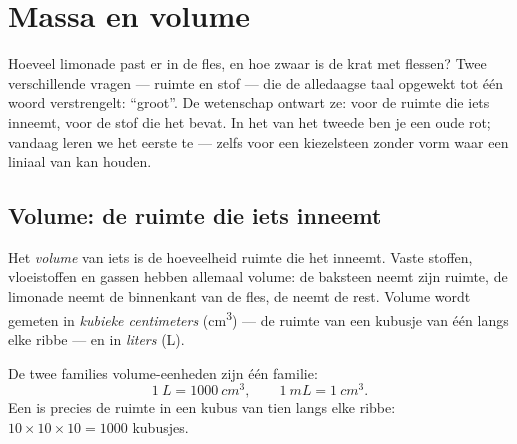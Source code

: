 \chapter{Massa en volume}\label{ch:g6:mass-and-volume}

Hoeveel limonade past er in de fles, en hoe zwaar is de krat met
flessen? Twee verschillende vragen --- ruimte en stof --- die de
alledaagse taal opgewekt tot één woord verstrengelt: ``groot''. De
wetenschap ontwart ze:  voor de ruimte die iets inneemt,
 voor de stof die het bevat. In het  van het tweede ben je
een oude rot; vandaag leren we het eerste te  --- zelfs voor een
kiezelsteen zonder vorm waar een liniaal van kan houden.

\section{Volume: de ruimte die iets inneemt}

\begin{definition}[Volume]\label{def:g6:mass-and-volume:volume}
Het \emph{volume} van iets is de hoeveelheid ruimte die
het inneemt. Vaste stoffen, vloeistoffen en gassen hebben allemaal
volume: de baksteen neemt zijn ruimte, de limonade neemt de binnenkant
van de fles, de  neemt de rest. Volume wordt gemeten in
\emph{kubieke centimeters} (\unit{cm^3}) ---
de ruimte van een kubusje van één  langs elke ribbe --- en in
\emph{liters} (\unit{L}).
\end{definition}

\begin{proposition}\label{prop:g6:mass-and-volume:litre}
De twee families volume-eenheden zijn één familie:
\[
\qty{1}{L} = \qty{1000}{cm^3},
\qquad
\qty{1}{mL} = \qty{1}{cm^3}.
\]
Een  is precies de ruimte in een kubus van tien
 langs elke ribbe: $10 \times 10 \times 10 = 1000$
kubusjes.
\end{proposition}

